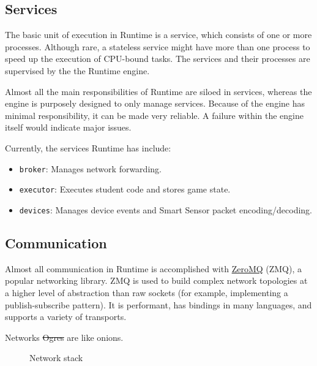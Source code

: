 \documentclass[12pt]{book}
\begin{document}
  \subsection{Services}

  The basic unit of execution in Runtime is a service, which consists of one or more processes.
  Although rare, a stateless service might have more than one process to speed up the execution of CPU-bound tasks.
  The services and their processes are supervised by the the Runtime engine.

  Almost all the main responsibilities of Runtime are siloed in services, whereas the engine is purposely designed to only manage services.
  Because of the engine has minimal responsibility, it can be made very reliable.
  A failure within the engine itself would indicate major issues.

  Currently, the services Runtime has include:
  \begin{itemize}
  \item \texttt{broker}: Manages network forwarding.
  \item \texttt{executor}: Executes student code and stores game state.
  \item \texttt{devices}: Manages device events and Smart Sensor packet encoding/decoding.
  \end{itemize}

  \subsection{Communication}

  Almost all communication in Runtime is accomplished with \href{https://zeromq.org/}{ZeroMQ} (ZMQ), a popular networking library.
  ZMQ is used to build complex network topologies at a higher level of abstraction than raw sockets (for example, implementing a publish-subscribe pattern).
  It is performant, has bindings in many languages, and supports a variety of transports.

  \begin{displayquote}
    Networks \sout{Ogres} are like onions.
  \end{displayquote}

  \begin{figure}[!ht]
    \centering
    \caption{Network stack}
    \label{fig:network-stack}
  \end{figure}
\end{document}
